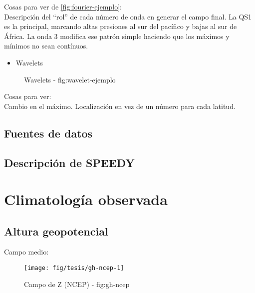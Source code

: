 \documentclass[spanish,a4paper]{book}
\providecommand{\tightlist}{%
  \setlength{\itemsep}{0pt}\setlength{\parskip}{0pt}}
\begin{document}
Cosas para ver de \autoref{fig:fourier-ejemplo}:\\
Descripción del ``rol'' de cada número de onda en generar el campo
final. La QS1 es la principal, marcando altas presiones al sur del
pacífico y bajas al sur de África. La onda 3 modifica ese patrón simple
haciendo que los máximos y mínimos no sean contínuos.

\begin{itemize}
\tightlist
\item
  Wavelets
\end{itemize}

\begin{figure*}
\caption{Wavelets - fig:wavelet-ejemplo}\label{fig:wavelet-ejemplo}
\end{figure*}

Cosas para ver:\\
Cambio en el máximo. Localización en vez de un número para cada latitud.

\section{Fuentes de datos}\label{fuentes-de-datos}

\section{Descripción de SPEEDY}\label{descripcion-de-speedy}

\chapter{Climatología observada}\label{climatologia-observada}

\section{Altura geopotencial}\label{altura-geopotencial}

Campo medio:

\begin{figure}

{\centering \texttt{[image: fig/tesis/gh-ncep-1]} 

}

\caption{Campo de Z (NCEP) - fig:gh-ncep}\label{fig:gh-ncep}
\end{figure}
\end{document}
